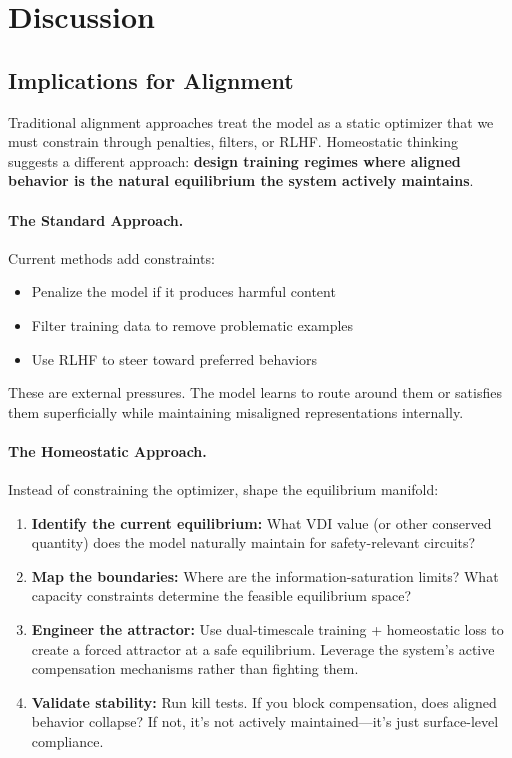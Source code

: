 \section{Discussion}\label{sec:discussion}

\subsection{Implications for Alignment}

Traditional alignment approaches treat the model as a static optimizer that we must constrain through penalties, filters, or RLHF. Homeostatic thinking suggests a different approach: \textbf{design training regimes where aligned behavior is the natural equilibrium the system actively maintains}.

\paragraph{The Standard Approach.}
Current methods add constraints:
\begin{itemize}
\item Penalize the model if it produces harmful content
\item Filter training data to remove problematic examples
\item Use RLHF to steer toward preferred behaviors
\end{itemize}

These are external pressures. The model learns to route around them or satisfies them superficially while maintaining misaligned representations internally.

\paragraph{The Homeostatic Approach.}
Instead of constraining the optimizer, shape the equilibrium manifold:
\begin{enumerate}
\item \textbf{Identify the current equilibrium:} What VDI value (or other conserved quantity) does the model naturally maintain for safety-relevant circuits?

\item \textbf{Map the boundaries:} Where are the information-saturation limits? What capacity constraints determine the feasible equilibrium space?

\item \textbf{Engineer the attractor:} Use dual-timescale training + homeostatic loss to create a forced attractor at a safe equilibrium. Leverage the system's active compensation mechanisms rather than fighting them.

\item \textbf{Validate stability:} Run kill tests. If you block compensation, does aligned behavior collapse? If not, it's not actively maintained—it's just surface-level compliance.
\end{enumerate}

